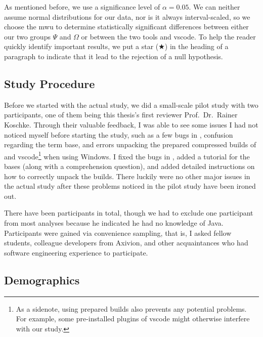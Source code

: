 \documentclass[../thesis]{subfiles}
\begin{document}
As mentioned before, we use a significance level of $\alpha = 0.05$.
We can neither assume normal distributions for our data, nor is it always interval-scaled, so we choose the \gls{mwu} to determine statistically significant differences between either our two groups $\Psi$ and $\Omega$ or between the two tools \SEE{} and \gls{vscode}.
To help the reader quickly identify important results, we put a star ($\bigstar$) in the heading of a paragraph to indicate that it lead to the rejection of a null hypothesis.



\subsection{Study Procedure}
Before we started with the actual study, we did a small-scale pilot study with two participants, one of them being this thesis's first reviewer Prof.\ Dr.\ Rainer Koschke.
Through their valuable feedback, I was able to see some issues I had not noticed myself before starting the study, such as a few bugs in \SEE{}, confusion regarding the term \gls{base}, and errors unpacking the prepared compressed builds of \SEE{} and \gls{vscode}\footnote{
	As a sidenote, using prepared builds also prevents any potential problems.
	For example, some pre-installed plugins of \gls{vscode} might otherwise interfere with our study.
} when using Windows.
I fixed the bugs in \SEE{}, added a tutorial for the \glspl{base} (along with a comprehension question), and added detailed instructions on how to correctly unpack the builds.
There luckily were no other major issues in the actual study after these problems noticed in the pilot study have been ironed out.

There have been \participants participants in total, though we had to exclude one participant from most analyses because he indicated he had no knowledge of Java.
Participants were gained via convenience sampling, that is, I asked fellow students, colleague developers from Axivion, and other acquaintances who had software engineering experience to participate.


\subsection{Demographics}
\end{document}
